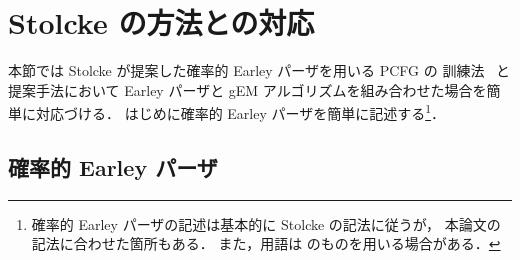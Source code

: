 {\section{Stolcke の方法との対応}
\label{sec:Stolcke}

本節では Stolcke が提案した確率的 Earley パーザを用いる PCFG の
訓練法~\cite{Stolcke95} と提案手法において Earley パーザと gEM
アルゴリズムを組み合わせた場合を簡単に対応づける．
はじめに確率的 Earley パーザを簡単に記述する\footnote{
確率的 Earley パーザの記述は基本的に Stolcke の記法に従うが，
本論文の記法に合わせた箇所もある．
また，用語は \cite{Tanaka88} のものを用いる場合がある．
}．

\subsection{確率的 Earley パーザ}

}
